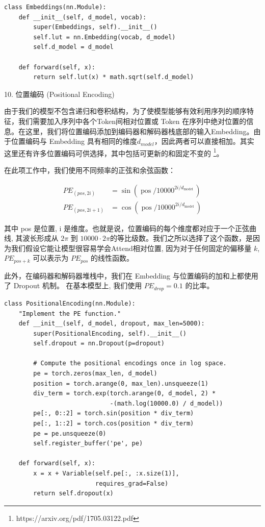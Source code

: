 \begin{Verbatim}
class Embeddings(nn.Module):
    def __init__(self, d_model, vocab):
        super(Embeddings, self).__init__()
        self.lut = nn.Embedding(vocab, d_model)
        self.d_model = d_model

    def forward(self, x):
        return self.lut(x) * math.sqrt(self.d_model)
\end{Verbatim}

10. 位置编码 (Positional Encoding)

由于我们的模型不包含递归和卷积结构，为了使模型能够有效利用序列的顺序特征，我们需要加入序列中各个Token间相对位置或 Token 在序列中绝对位置的信息。在这里，我们将位置编码添加到编码器和解码器栈底部的输入Embedding。由于位置编码与 Embedding 具有相同的维度$d_{model}$，因此两者可以直接相加。其实这里还有许多位置编码可供选择，其中包括可更新的和固定不变的 \footnote{https://arxiv.org/pdf/1705.03122.pdf}。

在此项工作中，我们使用不同频率的正弦和余弦函数：

\begin{equation}
\begin{aligned}
P E_{(p o s, 2 i)} &=\sin \left(\operatorname{pos} / 10000^{2 i / d_{\text {model }}}\right) \\
P E_{(p o s, 2 i+1)} &=\cos \left(\operatorname{pos} / 10000^{2 i / d_{\text {model }}}\right)
\end{aligned}
\end{equation}

其中 pos 是位置, i 是维度。也就是说，位置编码的每个维度都对应于一个正弦曲线, 其波长形成从 $2\pi$ 到 $10000 \cdot 2 \pi$的等比级数。我们之所以选择了这个函数，是因为我们假设它能让模型很容易学会Attend相对位置, 因为对于任何固定的偏移量 $k$, $PE_{pos+k}$ 可以表示为 $PE_{pos}$ 的线性函数。

此外，在编码器和解码器堆栈中，我们在 Embedding 与位置编码的加和上都使用了 Dropout 机制。 在基本模型上, 我们使用 $PE_{drop} = 0.1$ 的比率。

\begin{Verbatim}
class PositionalEncoding(nn.Module):
    "Implement the PE function."
    def __init__(self, d_model, dropout, max_len=5000):
        super(PositionalEncoding, self).__init__()
        self.dropout = nn.Dropout(p=dropout)
        
        # Compute the positional encodings once in log space.
        pe = torch.zeros(max_len, d_model)
        position = torch.arange(0, max_len).unsqueeze(1)
        div_term = torch.exp(torch.arange(0, d_model, 2) *
                             -(math.log(10000.0) / d_model))
        pe[:, 0::2] = torch.sin(position * div_term)
        pe[:, 1::2] = torch.cos(position * div_term)
        pe = pe.unsqueeze(0)
        self.register_buffer('pe', pe)
        
    def forward(self, x):
        x = x + Variable(self.pe[:, :x.size(1)], 
                         requires_grad=False)
        return self.dropout(x)
\end{Verbatim}

